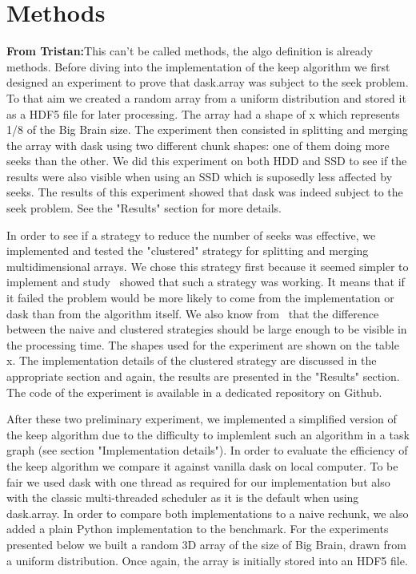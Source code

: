 \documentclass[conference]{IEEEtran}
\newcommand{\tristan}[1]{\color{orange}\textbf{From Tristan:}#1\color{black}}
\begin{document}
\section{Methods}
\tristan{This can't be called methods, the algo definition is already methods.}
Before diving into the implementation of the keep algorithm we first designed
an experiment to prove that dask.array was subject to the seek problem. To that
aim we created a random array from a uniform distribution and stored it as a
HDF5 file for later processing. The array had a shape of x which represents 1/8
of the Big Brain size. The experiment then consisted in splitting and merging
the array with dask using two different chunk shapes: one of them doing more
seeks than the other. We did this experiment on both HDD and SSD to see if the
results were also visible when using an SSD which is suposedly less affected by
seeks. The results of this experiment showed that dask was indeed subject to the
seek problem. See the "Results" section for more details.

In order to see if a strategy to reduce the number of seeks was effective, we
implemented and tested the "clustered" strategy for splitting and merging
multidimensional arrays. We chose this strategy first because it seemed simpler
to implement and study~\cite{seqalgorithms} showed that such a strategy was
working. It means that if it failed the problem would be more likely to come
from the implementation or dask than from the algorithm itself. We also know
from~\cite{seqalgorithms} that the difference between the naive and clustered
strategies should be large enough to be visible in the processing time. The
shapes used for the experiment are shown on the table x. The implementation
details of the clustered strategy are discussed in the appropriate section and
again, the results are presented in the "Results" section. The code of the
experiment is available in a dedicated repository on Github.

After these two preliminary experiment, we implemented a simplified version of
the keep algorithm due to the difficulty to implemlent such an algorithm in a
task graph (see section "Implementation details"). In order to evaluate the
efficiency of the keep algorithm we compare it against vanilla dask on local
computer. To be fair we used dask with one thread as required for our
implementation but also with the classic multi-threaded  scheduler as it is the
default when using dask.array. In order to compare both implementations to a
naive rechunk, we also added a plain Python implementation to the benchmark. For
the experiments presented below we built a random 3D array of the size of Big
Brain, drawn from a uniform distribution. Once again, the array is initially
stored into an HDF5 file.
\end{document}
